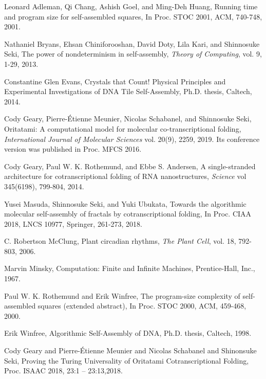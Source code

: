 \documentclass[runningheads]{llncs}
\begin{document}
\begin{thebibliography}{1}

Leonard Adleman, Qi Chang, Ashish Goel, and Ming-Deh Huang, 
Running time and program size for self-assembled squares, 
In Proc. STOC 2001, ACM, 740-748, 2001. 

Nathaniel Bryans, Ehsan Chiniforooshan, David Doty, Lila Kari, and Shinnosuke Seki, 
The power of nondeterminism in self-assembly, 
\textit{Theory of Computing}, vol. 9, 1-29, 2013.

Constantine Glen Evans, 
Crystals that Count! Physical Principles and Experimental Investigations of {DNA} Tile Self-Assembly, 
Ph.D. thesis, Caltech, 2014.

Cody Geary, Pierre-\'{E}tienne Meunier, Nicolas Schabanel, and Shinnosuke Seki, 
Oritatami: A computational model for molecular co-transcriptional folding, 
\textit{International Journal of Molecular Sciences} vol. 20(9), 2259, 2019. Its conference version was published in Proc. MFCS 2016. 

Cody Geary, Paul W. K. Rothemund, and Ebbe S. Andersen, 
A single-stranded architecture for cotranscriptional folding of {RNA} nanostructures, 
\textit{Science} vol 345(6198), 799-804, 2014.

Yusei Masuda, Shinnosuke Seki, and Yuki Ubukata, 
Towards the algorithmic molecular self-assembly of fractals by cotranscriptional folding, 
In Proc. CIAA 2018, LNCS 10977, Springer, 261-273, 2018.

C. Robertson McClung, 
Plant circadian rhythms, 
\textit{The Plant Cell}, vol. 18, 792-803, 2006.

Marvin Minsky, 
Computation: Finite and Infinite Machines, 
Prentice-Hall, Inc., 1967. 

Paul W. K. Rothemund and Erik Winfree, 
The program-size complexity of self-assembled squares (extended abstract), 
In Proc. STOC 2000, ACM, 459-468, 2000.

Erik Winfree, 
Algorithmic Self-Assembly of {DNA}, 
Ph.D. thesis, Caltech, 1998.

Cody Geary and Pierre-\'Etienne Meunier and Nicolas Schabanel and Shinonsuke Seki,
Proving the {T}uring Universality of Oritatami Cotranscriptional Folding,
Proc. ISAAC 2018,
23:1 -- 23:13,2018.


\end{thebibliography}
  
\end{document}
